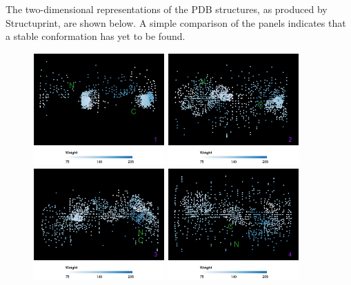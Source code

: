 \documentclass[12pt,a4paper]{article}
\begin{document}
The two-dimensional representations of the PDB structures, as produced 
by Structuprint, are shown below. A simple comparison of the panels 
indicates that a stable conformation has yet to be found.
\vspace{-0.25cm}
\begin{figure}[!htbp]
    \centering
	\includegraphics[width=0.45\textwidth]{figures/tutorial/frame_1.png}
	\includegraphics[width=0.45\textwidth]{figures/tutorial/frame_2.png}\\
	\includegraphics[width=0.45\textwidth]{figures/tutorial/frame_3.png}
	\includegraphics[width=0.45\textwidth]{figures/tutorial/frame_4.png}
	
\end{figure}
\end{document}
